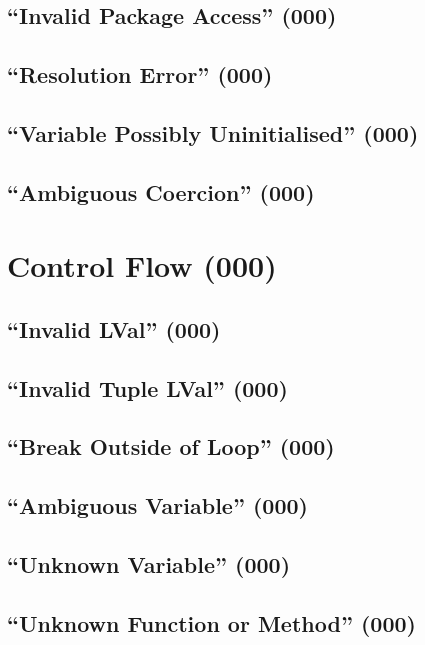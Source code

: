 \subsection{``Invalid Package Access'' (000)}

\subsection{``Resolution Error'' (000)}

\subsection{``Variable Possibly Uninitialised'' (000)}

\subsection{``Ambiguous Coercion'' (000)}


\section{Control Flow (000)}

\subsection{``Invalid LVal'' (000)}

\subsection{``Invalid Tuple LVal'' (000)}

\subsection{``Break Outside of Loop'' (000)}

\subsection{``Ambiguous Variable'' (000)}

\subsection{``Unknown Variable'' (000)}

\subsection{``Unknown Function or Method'' (000)}

